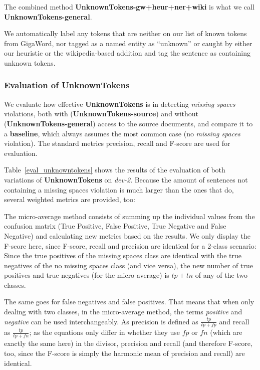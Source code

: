 \documentclass[a4paper,10pt]{scrartcl}
\theoremstyle{style}
\begin{document}
The combined method \textbf{UnknownTokens-gw+heur+ner+wiki} is what we call \textbf{UnknownTokens-general}.

We automatically label any tokens that are neither on our list of known tokens from GigaWord, nor tagged as a named entity as ``unknown'' or caught by either our heuristic or the wikipedia-based addition and tag the sentence as containing unknown tokens.

\subsubsection{Evaluation of UnknownTokens}
We evaluate how effective \textbf{UnknownTokens} is in detecting \textit{missing spaces} violations, both with (\textbf{UnknownTokens-source}) and without (\textbf{UnknownTokens-general}) access to the source documents, and compare it to a \textbf{baseline}, which always assumes the most common case (no \textit{missing spaces} violation).
The standard metrics precision, recall and F-score are used for evaluation.

Table~\ref{eval_unknowntokens} shows the results of the evaluation of both variations of \textbf{UnknownTokens} on \textit{dev-2}. Because the amount of sentences not containing a missing spaces violation is much larger than the ones that do, several weighted metrics are provided, too:

The micro-average method consists of summing up the individual values from the confusion matrix (True Positive, False Positive, True Negative and False Negative) and calculating new metrics based on the results. We only display the F-score here, since F-score, recall and precision are identical for a 2-class scenario: Since the true positives of the missing spaces class are identical with the true negatives of the no missing spaces class (and vice versa), the new number of true positives and true negatives (for the micro average) is $tp + tn$ of any of the two classes. 

The same goes for false negatives and false positives. That means that when only dealing with two classes, in the micro-average method, the terms \textit{positive} and \textit{negative} can be used interchangeably. As precision is defined as $\frac{tp}{tp+fp}$ and recall as $\frac{tp}{tp+fn}$; as the equations only differ in whether they use $fp$ or $fn$ (which are exactly the same here) in the divisor, precision and recall (and therefore F-score, too, since the F-score is simply the harmonic mean of precision and recall) are identical.
\end{document}
